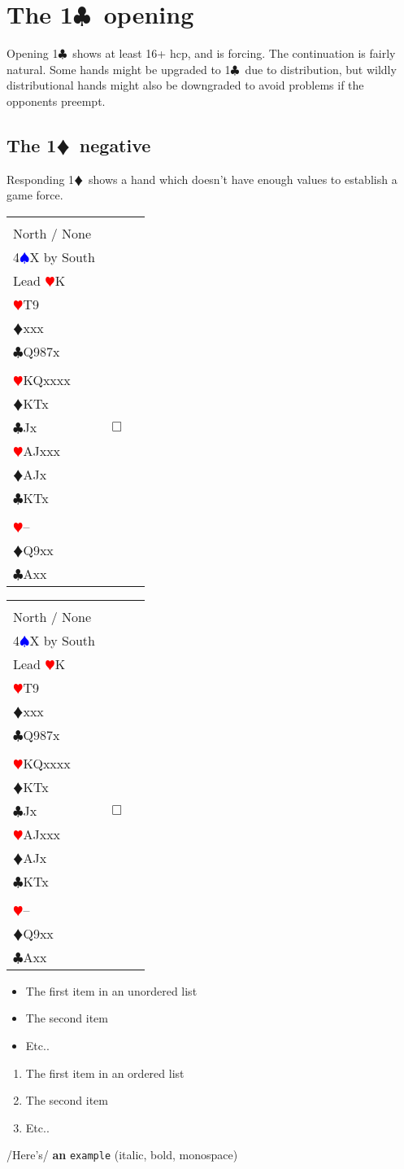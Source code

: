 \documentclass[a4paper]{article}
\newcommand{\BC}{\textcolor{OliveGreen}{$\clubsuit$}}
\newcommand{\BD}{\textcolor{RedOrange}{$\vardiamondsuit$}}
\newcommand{\BH}{\textcolor{Red}{$\varheartsuit${}}}
\newcommand{\BS}{\textcolor{Blue}{$\spadesuit${}}}
\newcommand{\pdfc}{\texorpdfstring{\BC{}}{C}}
\newcommand{\pdfd}{\texorpdfstring{\BD{}}{D}}
\newcommand{\cards}[1]{\textsf{#1}}
\newcommand{\spades}[1]{\BS\cards{#1}}
\newcommand{\hearts}[1]{\BH\cards{#1}}
\newcommand{\diamonds}[1]{\BD\cards{#1}}
\newcommand{\clubs}[1]{\BC\cards{#1}}
\newcommand{\void}{--}
\newcommand{\vhand}[4]{\spades{#1}\\\hearts{#2}\\\diamonds{#3}\\\clubs{#4}}
\newcommand\dealdiagram[5]%
{%
  \begin{center}%
    \begin{tabular}{>{\hfill}p{3cm}cp{3cm}}
      \pbox{20cm}{\small #5}& \pbox{20cm}{#2} \\%
      \pbox{20cm}{#1}& $\Box$    & \pbox{20cm}{#3} \\%
                & \pbox{20cm}{#4} %
    \end{tabular}
  \end{center}%
}
\begin{document}
\section{The 1\pdfc\ opening}

Opening 1\BC\ shows at least 16+ hcp, and is forcing. The
continuation is fairly natural.
\bigbreak
Some hands might be upgraded to 1\BC\ due to distribution, but
wildly distributional hands might also be downgraded to avoid
problems if the opponents preempt.
\bigbreak
\subsection{The 1\pdfd\ negative}

Responding 1\BD\ shows a hand which doesn't have enough values to
establish a game force.
\bigbreak
\dealdiagram
{\vhand{QT}{KQxxxx}{KTx}{Jx}}
{\vhand{Kxx}{T9}{xxx}{Q987x}}
{\vhand{Jx}{AJxxx}{AJx}{KTx}}
{\vhand{A987xx}{\void}{Q9xx}{Axx}}
{Board 35\\North / None\\4\BS X by South\\Lead \BH K}

\dealdiagram
{\vhand{QT}{KQxxxx}{KTx}{Jx}}
{\vhand{Kxx}{T9}{xxx}{Q987x}}
{\vhand{Jx}{AJxxx}{AJx}{KTx}}
{\vhand{A987xx}{\void}{Q9xx}{Axx}}
{Board 35\\North / None\\4\BS X by South\\Lead \BH K}

\begin{itemize}
\item The first item in an unordered list

\item The second item

\item Etc..

\end{itemize}
\bigbreak
\begin{enumerate}
\item The first item in an ordered list

\item The second item

\item Etc..

\end{enumerate}
\bigbreak
/Here's/ \textbf{an} \texttt{example} (italic, bold, monospace)
\bigbreak
\end{document}
